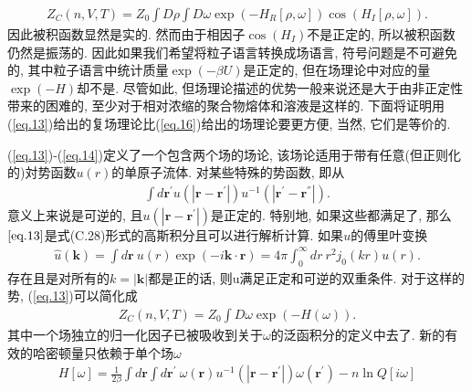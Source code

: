 \label{subsec.equations}
   \begin{equation}
       \begin{aligned}
           Z_C(n, V, T)=Z_0 \int D\rho \int D\omega \exp(-H_R[\rho, \omega])
           \cos(H_I[\rho, \omega]).
        \end{aligned}
       \label{eq.16}
    \end{equation}
因此被积函数显然是实的. 然而由于相因子$\cos(H_I)$不是正定的,
所以被积函数仍然是振荡的.
因此如果我们希望将粒子语言转换成场语言, 符号问题是不可避免的,
其中粒子语言中统计质量$\exp(-\beta U)$是正定的,
但在场理论中对应的量$\exp(-H)$却不是. 尽管如此,
但场理论描述的优势一般来说还是大于由非正定性带来的困难的,
至少对于相对浓缩的聚合物熔体和溶液是这样的.
下面将证明用(\ref{eq.13})给出的复场理论比(\ref{eq.16})给出的场理论要更方便,
当然, 它们是等价的.
\par
(\ref{eq.13})-(\ref{eq.14})定义了一个包含两个场的场论,
该场论适用于带有任意(但正则化的)対势函数$u(r)$的单原子流体. 对某些特殊的势函数,
即从
\label{subsec.equations}
   \begin{equation}
       \begin{aligned}
           \int d\bm{r^{'}} u(|\bm{r}-\bm{r^{'}}|)
           u^{-1}(|\bm{r^{'}}-\bm{r^{''}}|).
       \end{aligned}
       \label{eq.17}
    \end{equation}
意义上来说是可逆的, 且$u(|\bm{r}-\bm{r^{'}}|)$是正定的. 特别地,
如果这些都满足了, 那么$\ref{eq.13}$是式(C.28)形式的高斯积分且可以进行解析计算.
如果$u$的傅里叶变换
\label{subsec.equations}
   \begin{equation}
       \begin{aligned}
           \hat{u}(\bm{k})=\int d\bm{r}\ u(r)\exp(-i\bm{k\cdot
           r})=4\pi\int_0^{\infty} dr\ r^2 j_0(kr)u(r).         
       \end{aligned}
       \label{eq.18}
    \end{equation}
存在且是对所有的$k=|\bm{k}|$都是正的话,
则u满足正定和可逆的双重条件. 对于这样的势, (\ref{eq.13})可以简化成
\label{subsec.equations}
   \begin{equation}
       \begin{aligned}
       Z_C(n, V, T)=Z_0\int D\omega \exp(-H(\omega)).
       \end{aligned}
       \label{eq.19}
    \end{equation}
其中一个场独立的归一化因子已被吸收到关于$\omega$的泛函积分的定义中去了.
新的有效的哈密顿量只依赖于单个场$\omega$
\label{subsec.equations}
   \begin{equation}
       \begin{aligned}
           H[\omega]=\frac{1}{2\beta}\int d\bm{r} \int d\bm{r^{'}}\
           \omega(\bm{r}) u^{-1}(|\bm{r}-\bm{r^{'}}|)\omega(\bm{r^{'}}) -n\ln
           Q[i\omega]
       \end{aligned}
       \label{eq.20}
    \end{equation}
